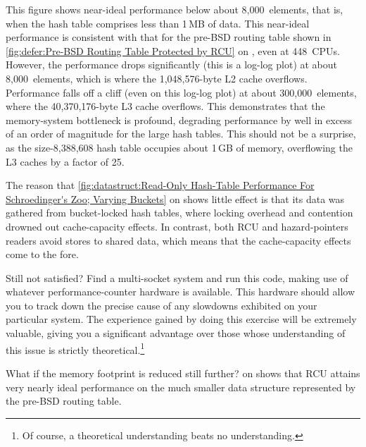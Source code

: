 {	This figure shows near-ideal performance below about 8,000~elements,
	that is, when the hash table comprises less than 1\,MB of data.
	This near-ideal performance is consistent with that for the
	pre-BSD routing table shown in
	\cref{fig:defer:Pre-BSD Routing Table Protected by RCU}
	on ,
	even at 448~CPUs.
	However, the performance drops significantly (this is a log-log
	plot) at about 8,000~elements, which is where the 1,048,576-byte
	L2 cache overflows.
	Performance falls off a cliff (even on this log-log plot) at about
	300,000~elements, where the 40,370,176-byte L3 cache overflows.
	This demonstrates that the memory-system bottleneck is profound,
	degrading performance by well in excess of an order of magnitude
	for the large hash tables.
	This should not be a surprise, as the size-8,388,608 hash table
	occupies about 1\,GB of memory, overflowing the L3 caches by
	a factor of 25.

	The reason that
	\cref{fig:datastruct:Read-Only Hash-Table Performance For Schroedinger's Zoo; Varying Buckets}
	on 
	shows little effect is that its data was gathered from
	bucket-locked hash tables, where locking overhead and contention
	drowned out cache-capacity effects.
	In contrast, both RCU and hazard-pointers readers avoid stores
	to shared data, which means that the cache-capacity effects come
	to the fore.

	Still not satisfied?
	Find a multi-socket system and run this code, making use of
	whatever performance-counter hardware is available.
	This hardware should allow you to track down the precise cause
	of any slowdowns exhibited on your particular system.
	The experience gained by doing this exercise will be extremely
	valuable, giving you a significant advantage over those whose
	understanding of this issue is strictly theoretical.\footnote{
		Of course, a theoretical understanding beats no
		understanding.}
}\QuickQuizEnd

What if the memory footprint is reduced still further?
on 
shows that RCU attains very nearly ideal performance on the much smaller
data structure represented by the pre-BSD routing table.

